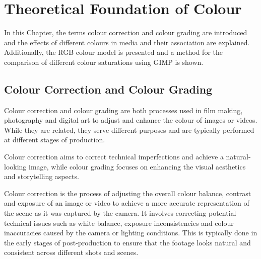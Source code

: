 \documentclass[../MasterThesis.tex]{subfiles}
\begin{document}
	

%
%
%
%
%
%
%
%
\newpage

\section{Theoretical Foundation of Colour} \label{section:theoreticalfoundationofcolour}

In this Chapter, the terms colour correction and colour grading are introduced and the effects of different colours in media and their association are explained. Additionally, the RGB colour model is presented and a method for the comparison of different colour saturations using GIMP is shown.





\subsection{Colour Correction and Colour Grading} 


Colour correction and colour grading are both processes used in film making, photography and digital art to adjust and enhance the colour of images or videos. 
While they are related, they serve different purposes and are typically performed at different stages of production.

Colour correction aims to correct technical imperfections and achieve a natural-looking image, while colour grading focuses on enhancing the visual aesthetics and storytelling aspects.~\cite{cc_cg_1, cc_cg_2}


Colour correction is the process of adjusting the overall colour balance, contrast and exposure of an image or video to achieve a more accurate representation of the scene as it was captured by the camera. It involves correcting potential technical issues such as white balance, exposure inconsistencies and colour inaccuracies caused by the camera or lighting conditions.
This is typically done in the early stages of post-production to ensure that the footage looks natural and consistent across different shots and scenes.~\cite{cc1, cc_cg_1, cc_cg_2}
\end{document}
